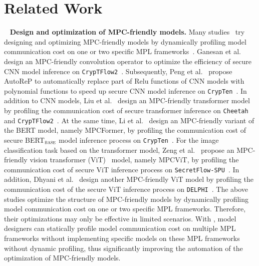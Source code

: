 \section{Related Work}~\label{sec:related}
\noindent\textbf{Design and optimization of MPC-friendly models.} Many studies~\cite{ganesan2022efficient, Peng_2023_ICCV, li2023mpcformer, liu2023llms, MPCViT, dhyani2023privit,10179422} try designing and optimizing MPC-friendly models by dynamically profiling model communication cost on one or two specific MPL frameworks~\cite{9444564}. Ganesan et al.~\cite{ganesan2022efficient} design an MPC-friendly convolution operator to optimize the efficiency of secure CNN model inference on \texttt{CrypTFlow2}~\cite{rathee2020cryptflow2}. Subsequently, Peng et al.~\cite{Peng_2023_ICCV} propose AutoReP to automatically replace part of Relu functions of CNN models with polynomial functions to speed up secure CNN model inference on \texttt{CrypTen}~\cite{crypten2020}. In addition to CNN models, Liu et al.~\cite{liu2023llms} design an MPC-friendly transformer model by profiling the communication cost of secure transformer inference on \texttt{Cheetah}~\cite{Cheetah} and \texttt{CrypTFlow2}~\cite{rathee2020cryptflow2}. At the same time, Li et al.~\cite{li2023mpcformer} design an MPC-friendly variant of the BERT model, namely MPCFormer, by profiling the communication cost of secure BERT$_{\textsc{base}}$ model inference process on \texttt{CrypTen}~\cite{crypten2020}. For the image classification task based on the transformer model, Zeng et al.~\cite{MPCViT} propose an MPC-friendly vision transformer (ViT)~\cite{dosovitskiy2021an} model, namely MPCViT, by profiling the communication cost of secure ViT inference process on \texttt{SecretFlow-SPU}~\cite{secretflow}. In addition, Dhyani et al.~\cite{dhyani2023privit} design another MPC-friendly ViT model by profiling the communication cost of the secure ViT inference process on \texttt{DELPHI}~\cite{244032}. The above studies optimize the structure of MPC-friendly models by dynamically profiling model communication cost on one or two specific MPL frameworks. Therefore, their optimizations may only be effective in limited scenarios. With \hawkeye, model designers can statically profile model communication cost on multiple MPL frameworks without implementing specific models on these MPL frameworks without dynamic profiling, thus significantly improving the automation of the optimization of MPC-friendly models.

